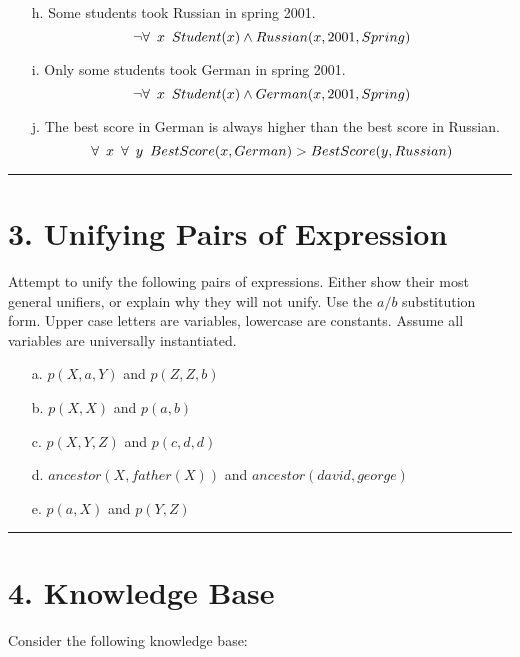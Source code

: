 \documentclass[11pt]{article}
\begin{document}
\begin{flushleft}
\begin{enumerate}
    \item[h.] Some students took Russian in spring 2001.
        $$ \neg \forall \hspace{0.5em} x \hspace{0.5em} Student(x) \wedge
        Russian(x, 2001, Spring) $$

    \item[i.] Only some students took German in spring 2001.
        $$ \neg \forall \hspace{0.5em} x \hspace{0.5em} Student(x) \wedge
        German(x, 2001, Spring) $$

    \item[j.] The best score in German is always higher than the best score
        in Russian.
        $$ \forall \hspace{0.5em} x \hspace{0.5em} \forall \hspace{0.5em} y
        \hspace{0.5em} BestScore(x, German) > BestScore(y, Russian) $$

\end{enumerate}

\rule[0.1pt]{40em}{1.0pt}

\section*{3. Unifying Pairs of Expression}  Attempt to unify the following pairs
of expressions.  Either show their most general unifiers, or explain why they
will not unify. Use the ${a/b}$ substitution form. Upper case letters are
variables, lowercase are constants. Assume all variables are universally
instantiated. 

\begin{enumerate}

    \item[a.] $p(X, a, Y)$ and $p(Z, Z, b)$
    \item[b.] $p(X, X)$ and $p(a, b)$
    \item[c.] $p(X, Y, Z)$ and $p(c, d, d)$
    \item[d.] $ancestor(X, father(X))$ and $ancestor(david, george)$
    \item[e.] $p(a, X)$ and $p(Y,Z)$

\end{enumerate}

\rule[0.1pt]{40em}{1.0pt}

\section*{4. Knowledge Base} Consider the following knowledge base:


\end{flushleft}
\end{document}
